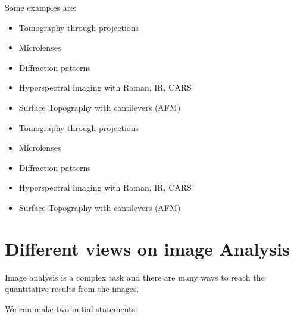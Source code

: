 \documentclass[letterpaper,10pt,english]{sphinxmanual}
\begin{document}
\sphinxAtStartPar
Some examples are:
\begin{itemize}
\item {} 
\sphinxAtStartPar
Tomography through projections

\item {} 
\sphinxAtStartPar
Microlenses 

\item {} 
\sphinxAtStartPar
Diffraction patterns

\item {} 
\sphinxAtStartPar
Hyperspectral imaging with Raman, IR, CARS

\item {} 
\sphinxAtStartPar
Surface Topography with cantilevers (AFM)

\end{itemize}


\begin{itemize}
\item {} 
\sphinxAtStartPar
Tomography through projections

\item {} 
\sphinxAtStartPar
Microlenses 

\end{itemize}


\begin{itemize}
\item {} 
\sphinxAtStartPar
Diffraction patterns

\item {} 
\sphinxAtStartPar
Hyperspectral imaging with Raman, IR, CARS

\item {} 
\sphinxAtStartPar
Surface Topography with cantilevers (AFM)

\end{itemize}




\chapter{Different views on image Analysis}
\label{\detokenize{01-Introduction:different-views-on-image-analysis}}
\sphinxAtStartPar
Image analysis is a complex task and there are many ways to reach the quantitative results from the images.

\sphinxAtStartPar
We can make two initial statements:
\end{document}

